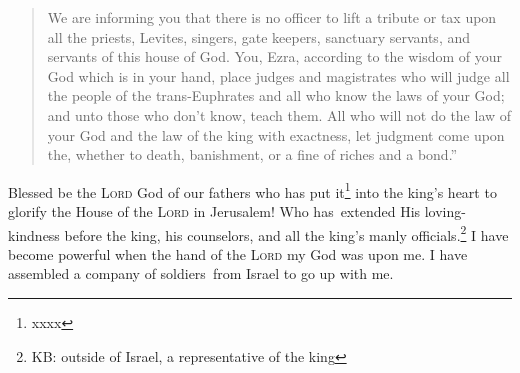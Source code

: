 \begin{quote}
\begin{inparaenum}
         We are informing you that there is no officer to lift a tribute or tax upon all the priests, Levites, singers, gate keepers, sanctuary servants, and servants of this house of God.%
         You, Ezra, according to the wisdom of your God which is in your hand, place judges and magistrates who will judge all the people of the trans-Euphrates and all who know the laws of your God; and unto those who don't know, teach them.%
         All who will not do the law of your God and the law of the king with exactness, let judgment come upon the, whether to death, banishment, or a fine of riches and a bond.''%
    \end{inparaenum}
\end{quote}
\begin{inparaenum}\setcounter{enumi}{26}
     Blessed be the \textsc{Lord} God of our fathers who has put it\footnote{xxxx} into the king's heart to glorify the House of the \textsc{Lord} in Jerusalem!%
     Who has\understood\ extended His loving-kindness before the king, his counselors, and all the king's manly officials.\footnote{KB: outside of Israel, a representative of the king} I have become powerful when the hand of the \textsc{Lord} my God was upon me. I have assembled a company of soldiers\understood\ from Israel to go up with me.%
\end{inparaenum}
